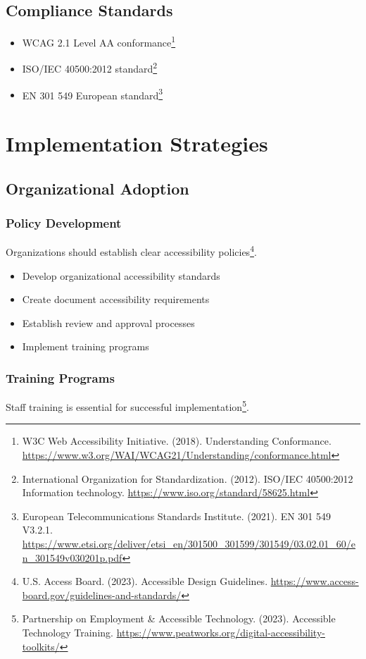 \subsection{Compliance Standards}
\begin{itemize}
\item WCAG 2.1 Level AA conformance\footnote{W3C Web Accessibility Initiative. (2018). Understanding Conformance. \url{https://www.w3.org/WAI/WCAG21/Understanding/conformance.html}}
\item ISO/IEC 40500:2012 standard\footnote{International Organization for Standardization. (2012). ISO/IEC 40500:2012 Information technology. \url{https://www.iso.org/standard/58625.html}}
\item EN 301 549 European standard\footnote{European Telecommunications Standards Institute. (2021). EN 301 549 V3.2.1. \url{https://www.etsi.org/deliver/etsi_en/301500_301599/301549/03.02.01_60/en_301549v030201p.pdf}}
\end{itemize}

\section{Implementation Strategies}

\subsection{Organizational Adoption}

\subsubsection{Policy Development}
Organizations should establish clear accessibility policies\footnote{U.S. Access Board. (2023). Accessible Design Guidelines. \url{https://www.access-board.gov/guidelines-and-standards/}}.

\begin{itemize}
\item Develop organizational accessibility standards
\item Create document accessibility requirements
\item Establish review and approval processes
\item Implement training programs
\end{itemize}

\subsubsection{Training Programs}
Staff training is essential for successful implementation\footnote{Partnership on Employment \& Accessible Technology. (2023). Accessible Technology Training. \url{https://www.peatworks.org/digital-accessibility-toolkits/}}.

